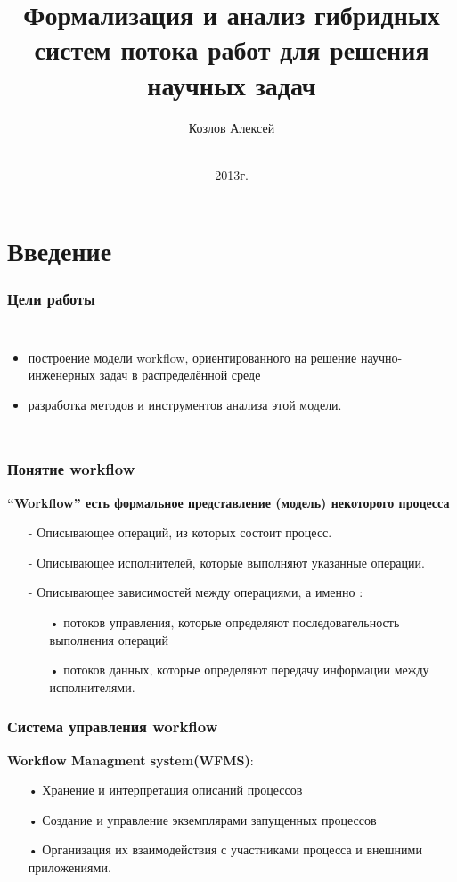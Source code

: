 \documentclass[10pt,pdf,hyperref={unicode}]{beamer}
\title{Формализация и анализ гибридных систем потока работ  для решения 
научных задач}
\author{Козлов Алексей}
\institute{НИУ ВШЭ
}
\date{
    \\
    2013г.
}
\begin{document}
\begin{frame}
  \maketitle
\end{frame}

\section{Введение}

\begin{frame}
  \frametitle{Цели работы}
 \begin{columns}
     \begin{itemize}
        \item<1-> построение модели workflow, ориентированного  на решение научно-инженерных задач в распределённой среде 
        \item<1-> разработка методов и инструментов анализа этой модели.
    \end{itemize}      


\end{columns}
\end{frame}

\begin{frame}
  \frametitle{Понятие workflow}
    \textbf{“Workflow”  есть формальное представление (модель) некоторого процесса}
\begin{enumerate}
\item[-] Описывающее операций, из которых состоит процесс.
\item[-] Описывающее исполнителей, которые выполняют указанные операции.
\item[-] Описывающее зависимостей между операциями, а именно :
\begin{enumerate}
\item[•] потоков управления, которые определяют последовательность выполнения операций 
\item[•] потоков данных, которые
определяют передачу информации между исполнителями.
\end{enumerate}
\end{enumerate}
\end{frame}

\begin{frame}
  \frametitle{Система управления workflow}
    \textbf{ Workflow Managment system(WFMS)}:
\begin{enumerate}
\item[•] Хранение и интерпретация описаний
процессов 
\item[•] Создание и управление экземплярами запущенных процессов
\item[•] Организация их взаимодействия с участниками
процесса и внешними приложениями.
\end{enumerate}
\end{frame}
\end{document}
